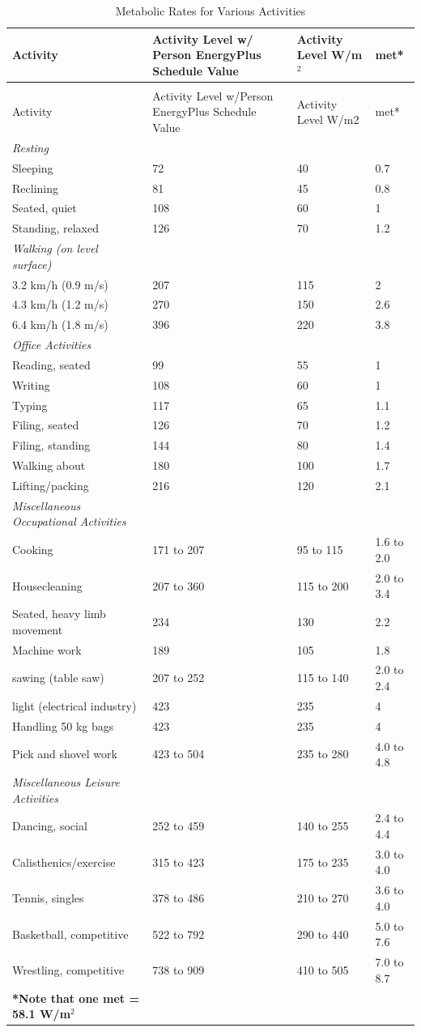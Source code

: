 \begin{longtable}[c]{p{2.0in}p{1.34in}p{1.33in}p{1.33in}}
\caption{Metabolic Rates for Various Activities \label{table:metabolic-rates-for-various-activities}} \tabularnewline
\toprule
Activity & Activity Level w/ Person EnergyPlus Schedule Value & Activity Level W/m\(^2\) & met* \tabularnewline
\midrule
\endfirsthead

\caption[]{Metabolic Rates for Various Activities} \tabularnewline
\toprule
Activity & Activity Level w/Person EnergyPlus Schedule Value & Activity Level W/m2 & met* \tabularnewline
\midrule
\endhead

\emph{Resting} \tabularnewline \midrule
Sleeping & 72 & 40 & 0.7 \tabularnewline
Reclining & 81 & 45 & 0.8 \tabularnewline
Seated, quiet & 108 & 60 & 1 \tabularnewline
Standing, relaxed & 126 & 70 & 1.2 \tabularnewline
\emph{Walking (on level surface)} \tabularnewline \midrule
3.2 km/h (0.9 m/s) & 207 & 115 & 2 \tabularnewline
4.3 km/h (1.2 m/s) & 270 & 150 & 2.6 \tabularnewline
6.4 km/h (1.8 m/s) & 396 & 220 & 3.8 \tabularnewline
\emph{Office Activities} \tabularnewline \midrule
Reading, seated & 99 & 55 & 1 \tabularnewline
Writing & 108 & 60 & 1 \tabularnewline
Typing & 117 & 65 & 1.1 \tabularnewline
Filing, seated & 126 & 70 & 1.2 \tabularnewline
Filing, standing & 144 & 80 & 1.4 \tabularnewline
Walking about & 180 & 100 & 1.7 \tabularnewline
Lifting/packing & 216 & 120 & 2.1 \tabularnewline
\emph{Miscellaneous Occupational Activities} \tabularnewline \midrule
Cooking & 171 to 207 & 95 to 115 & 1.6 to 2.0 \tabularnewline
Housecleaning & 207 to 360 & 115 to 200 & 2.0 to 3.4 \tabularnewline
Seated, heavy limb movement & 234 & 130 & 2.2 \tabularnewline
Machine work & 189 & 105 & 1.8 \tabularnewline
sawing (table saw) & 207 to 252 & 115 to 140 & 2.0 to 2.4 \tabularnewline
light (electrical industry) & 423 & 235 & 4 \tabularnewline
Handling 50 kg bags & 423 & 235 & 4 \tabularnewline
Pick and shovel work & 423 to 504 & 235 to 280 & 4.0 to 4.8 \tabularnewline
\emph{Miscellaneous Leisure Activities} \tabularnewline \midrule
Dancing, social & 252 to 459 & 140 to 255 & 2.4 to 4.4 \tabularnewline
Calisthenics/exercise & 315 to 423 & 175 to 235 & 3.0 to 4.0 \tabularnewline
Tennis, singles & 378 to 486 & 210 to 270 & 3.6 to 4.0 \tabularnewline
Basketball, competitive & 522 to 792 & 290 to 440 & 5.0 to 7.6 \tabularnewline
Wrestling, competitive & 738 to 909 & 410 to 505 & 7.0 to 8.7 \tabularnewline
\bottomrule
\scriptsize
\textbf{*Note that one met = 58.1 W/m\(^{2}\)}
\end{longtable}

